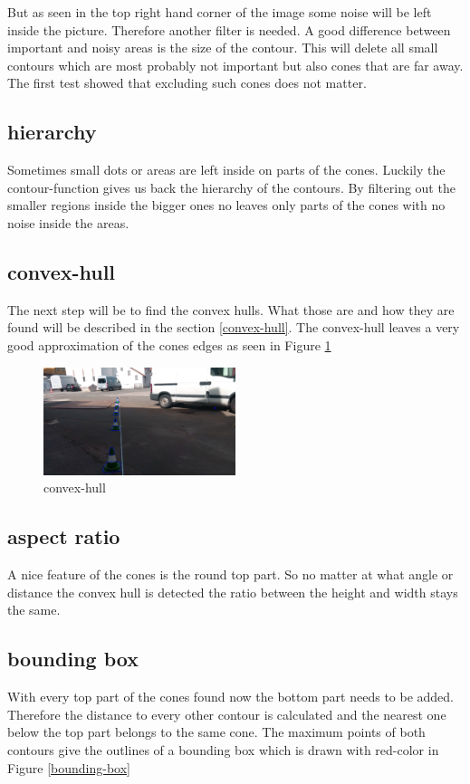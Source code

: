 \documentclass[10pt,a4paper]{article}
\begin{document}
	But as seen in the top right hand corner of the image some noise will be left inside the picture. Therefore another filter is needed. A good difference between important and noisy areas is the size of the contour. This will delete all small contours which are most probably not important but also cones that are far away. The first test showed that excluding such cones does not matter.
	
	\subsection{hierarchy}
	Sometimes small dots or areas are left inside on parts of the cones. Luckily the contour-function gives us back the hierarchy of the contours. By filtering out the smaller regions inside the bigger ones no leaves only parts of the cones with no noise inside the areas.
	
	\subsection{convex-hull}
	The next step will be to find the convex hulls. What those are and how they are found will be described in the section \ref{convex-hull}. The convex-hull leaves a very good approximation of the cones edges as seen in Figure \ref{convex-hull-picture}
	\begin{figure}[h]
		\centering
		\includegraphics[width=0.5\textwidth]{Abb/convex-hull.png}
		\caption{convex-hull}
		\label{convex-hull-picture}
	\end{figure}
	
	\subsection{aspect ratio}
	A nice feature of the cones is the round top part. So no matter at what angle or distance the convex hull is detected the ratio between the height and width stays the same.
	
	\subsection{bounding box}
	With every top part of the cones found now the bottom part needs to be added. Therefore the distance to every other contour is calculated and the nearest one below the top part belongs to the same cone.
	The maximum points of both contours give the outlines of a bounding box which is drawn with red-color in Figure \ref{bounding-box}
	
\end{document}
